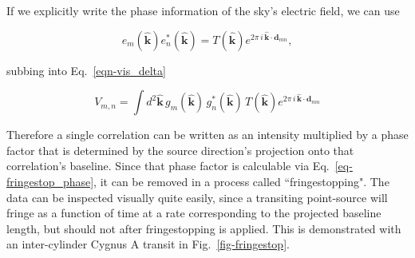 \noindent If we explicitly write the phase information of the sky's 
electric field, we can use

\begin{equation}
\label{eqn-tsky}
e_m(\mathbf{\hat{k}}) e_n^*(\mathbf{\hat{k}}) = T(\mathbf{\hat{k}}) 
e^{2\pi \,i \,\mathbf{\hat{k}} \cdot \mathbf{d}_{mn}},
\end{equation}

\noindent subbing into Eq.~\ref{eqn-vis_delta}

\begin{equation}
\label{eqn-visibility-temp}
     V_{m,n} = \int d^2\mathbf{\hat{k}} \,
     g_m(\mathbf{\hat{k}}) \, g^*_n(\mathbf{\hat{k}})\, T(\mathbf{\hat{k}}) 
e^{2\pi \,i \,\mathbf{\hat{k}} \cdot \mathbf{d}_{mn}}
\end{equation}


Therefore a single correlation can be written as an intensity multiplied 
by a phase factor that is determined by the source direction's
projection onto that correlation's baseline. Since that phase 
factor is calculable via Eq.~\ref{eq-fringestop_phase}, it 
can be removed in a process called ``fringestopping". The 
data can be inspected visually quite easily, since 
a transiting point-source will fringe as a function of 
time at a rate corresponding 
to the projected baseline length, but should not after fringestopping 
is applied. This is demonstrated with an inter-cylinder Cygnus A transit in 
Fig.~\ref{fig-fringestop}. 



